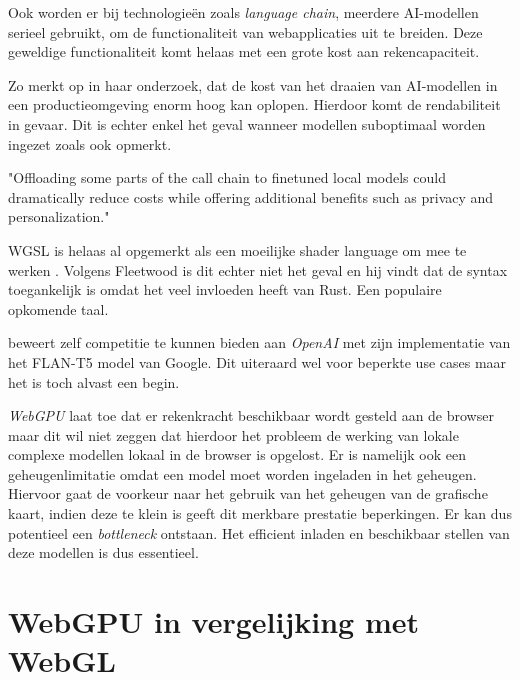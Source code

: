 \bigbreak{}

Ook worden er bij technologieën zoals \textit{language chain}, meerdere AI-mo\-de\-llen serieel gebruikt, om de functionaliteit van webapplicaties uit te breiden. Deze geweldige functionaliteit komt helaas met een grote kost aan rekencapaciteit.

\bigbreak{}

Zo merkt \textcite{Huyen2023} op in haar onderzoek, dat de kost van het draaien van AI-modellen in een productieomgeving enorm hoog kan oplopen. Hierdoor komt de rendabiliteit in gevaar. Dit is echter enkel het geval wanneer modellen suboptimaal worden ingezet zoals \textcite{Fleetwood2023a} ook opmerkt.

\begin{displayquote}
    "Offloading some parts of the call chain to finetuned local models could dramatically reduce costs while offering additional benefits such as privacy and personalization."
\end{displayquote}

\bigbreak{}

WGSL is helaas al opgemerkt als een moeilijke shader language om mee te werken \textcite{Madrigal2023}. Volgens Fleetwood is dit echter niet het geval en hij vindt dat de syntax toegankelijk is omdat het veel invloeden heeft van Rust. Een populaire opkomende taal.

\bigbreak{}

\textcite{Fleetwood2023a} beweert zelf competitie te kunnen bieden aan \textit{OpenAI} met zijn implementatie van het FLAN-T5 model van Google. Dit uiteraard wel voor beperkte use cases maar het is toch alvast een begin.

\textit{WebGPU} laat toe dat er rekenkracht beschikbaar wordt gesteld aan de browser maar dit wil niet zeggen dat hierdoor het probleem de werking van lokale complexe modellen lokaal in de browser is opgelost. Er is namelijk ook een geheugenlimitatie omdat een model moet worden ingeladen in het geheugen. Hiervoor gaat de voorkeur naar het gebruik van het geheugen van de grafische kaart, indien deze te klein is geeft dit merkbare prestatie beperkingen. Er kan dus potentieel een \textit{bottleneck} ontstaan. Het efficient inladen en beschikbaar stellen van deze modellen is dus essentieel.

\break{}

\section{WebGPU in vergelijking met WebGL} %

